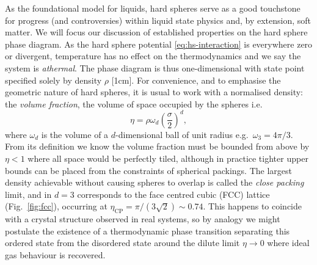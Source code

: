 \documentclass[11pt,twoside]{report}
\begin{document}
As the foundational model for liquids, hard spheres serve as a good touchstone for progress (and controversies) within liquid state physics and, by extension, soft matter.
We will focus our discussion of established properties on the hard sphere phase diagram.
As the hard sphere potential \eqref{eq:hs-interaction} is everywhere zero or divergent, temperature has no effect%
on the thermodynamics and we say the system is \emph{athermal}.
The phase diagram is thus one-dimensional with state point specified solely by density $\rho$%
[1cm].
For convenience, and to emphasise the geometric nature of hard spheres, it is usual to work with a normalised density: the \emph{volume fraction}, the volume of space occupied by the spheres i.e.\
\begin{equation}\label{eq:hs-volume-fraction}
  \eta
  =
  \rho \omega_d \left( \frac{\sigma}{2}\right)^d,
\end{equation}
where $\omega_d$ is the volume of a $d$-dimensional ball of unit radius e.g.\ $\omega_3 = 4\pi / 3$.
From its definition we know the volume fraction must be bounded from above by $\eta < 1$ where all space would be perfectly tiled, although in practice tighter upper bounds can be placed from the constraints of spherical packings.
The largest density achievable without causing spheres to overlap is called the \emph{close packing} limit, and in $d = 3$ corresponds to the face centred cubic (FCC) lattice (Fig.\ \ref{fig:fcc}), occurring at $\eta_\mathrm{CP} = \pi / (3\sqrt{2}) \sim 0.74$.
This happens to coincide with a crystal structure observed in real systems, so by analogy we might postulate the existence of a thermodynamic phase transition separating this ordered state from the disordered state around the dilute limit $\eta \to 0$ where ideal gas behaviour is recovered.
\end{document}
